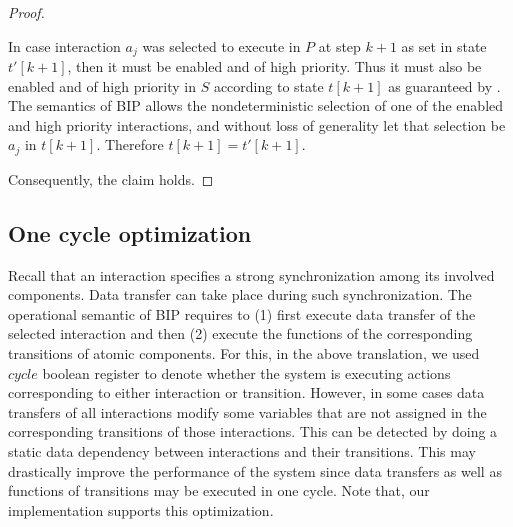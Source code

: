 \begin{proof}
\begin{enumerate}
In case interaction $a_j$ was selected to execute in $P$ at step $k+1$ as set in state $t'[k+1]$, 
then it must be enabled and of high priority.
Thus it must also be enabled and of high priority in $S$ according to state $t[k+1]$
as guaranteed by . 
The semantics of BIP allows the nondeterministic selection of
one of the enabled and high priority interactions, and without loss of generality let that selection be $a_j$ in $t[k+1]$. 
Therefore $t[k+1]=t'[k+1]$. 
\end{enumerate}
Consequently, the claim holds. 
\end{proof}





\subsection{One cycle optimization}
Recall that an interaction specifies a strong synchronization among its involved components. Data transfer can take place during such synchronization. The operational semantic of BIP requires to (1) first execute data transfer of the selected interaction and then (2) execute the functions of the corresponding transitions of atomic components. For this, in the above translation, we used $cycle$ boolean register to denote whether the system is executing actions corresponding to either interaction or transition. However, in some cases data transfers of all interactions modify some variables that are not assigned in the corresponding transitions of those interactions. This can be detected by doing a static data dependency between interactions and their transitions. 
This may drastically improve the performance of the system since data transfers as well as functions of transitions may be executed in one cycle. Note that, our implementation supports this optimization.   

